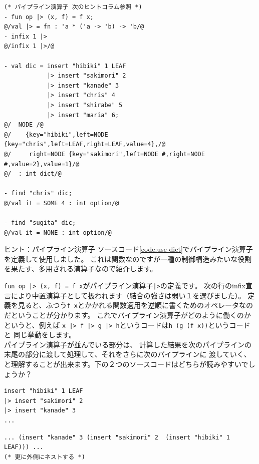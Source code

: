 \documentclass[11pt,a4paper]{article}
\begin{document}
\begin{lstlisting}[caption=dict型の利用,label=code:use-dict]
(* パイプライン演算子 次のヒントコラム参照 *)
- fun op |> (x, f) = f x;
@/val |> = fn : 'a * ('a -> 'b) -> 'b/@
- infix 1 |>
@/infix 1 |>/@

- val dic = insert "hibiki" 1 LEAF
            |> insert "sakimori" 2
            |> insert "kanade" 3
            |> insert "chris" 4
            |> insert "shirabe" 5
            |> insert "maria" 6;
@/  NODE /@
@/    {key="hibiki",left=NODE {key="chris",left=LEAF,right=LEAF,value=4},/@
@/     right=NODE {key="sakimori",left=NODE #,right=NODE #,value=2},value=1}/@
@/  : int dict/@

- find "chris" dic;
@/val it = SOME 4 : int option/@

- find "sugita" dic;
@/val it = NONE : int option/@
\end{lstlisting}

\begin{itembox}[l]{ヒント：パイプライン演算子}
ソースコード\ref{code:use-dict}でパイプライン演算子を定義して使用しました。
これは関数なのですが一種の制御構造みたいな役割を果たす、多用される演算子なので紹介します。

\lstinline{fun op |> (x, f) = f x}がパイプライン演算子\lstinline{|>}の定義です。
次の行のinfix宣言により中置演算子として扱われます（結合の強さは弱い１を選びました）。
定義を見ると、ふつう\lstinline{f x}とかかれる関数適用を逆順に書くためのオペレータなのだということが分かります。
これでパイプライン演算子がどのように働くのかというと、例えば
\lstinline{x |> f |> g |> h}というコードは\lstinline{h (g (f x))}というコードと
同じ挙動をします。\\
パイプライン演算子が並んでいる部分は、
計算した結果を次のパイプラインの末尾の部分に渡して処理して、それをさらに次のパイプラインに
渡していく、と理解することが出来ます。下の２つのソースコードはどちらが読みやすいでしょうか？

\begin{lstlisting}
insert "hibiki" 1 LEAF
|> insert "sakimori" 2
|> insert "kanade" 3
...
\end{lstlisting}

\begin{lstlisting}
... (insert "kanade" 3 (insert "sakimori" 2  (insert "hibiki" 1 LEAF))) ...
(* 更に外側にネストする *)
\end{lstlisting}

\end{itembox}
\end{document}
